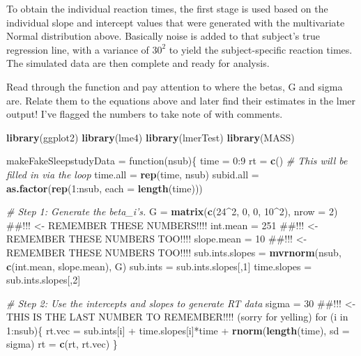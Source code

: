 \documentclass[]{book}
\newenvironment{Shaded}{\begin{snugshade}}{\end{snugshade}}
\newcommand{\KeywordTok}[1]{\textcolor[rgb]{0.13,0.29,0.53}{\textbf{{#1}}}}
\newcommand{\DataTypeTok}[1]{\textcolor[rgb]{0.13,0.29,0.53}{{#1}}}
\newcommand{\DecValTok}[1]{\textcolor[rgb]{0.00,0.00,0.81}{{#1}}}
\newcommand{\StringTok}[1]{\textcolor[rgb]{0.31,0.60,0.02}{{#1}}}
\newcommand{\CommentTok}[1]{\textcolor[rgb]{0.56,0.35,0.01}{\textit{{#1}}}}
\newcommand{\NormalTok}[1]{{#1}}
\begin{document}
To obtain the individual reaction times, the first stage is used based
on the individual slope and intercept values that were generated with
the multivariate Normal distribution above. Basically noise is added to
that subject's true regression line, with a variance of \(30^2\) to
yield the subject-specific reaction times. The simulated data are then
complete and ready for analysis.

Read through the function and pay attention to where the betas, G and
sigma are. Relate them to the equations above and later find their
estimates in the lmer output! I've flagged the numbers to take note of
with comments.

\begin{Shaded}
\begin{Highlighting}[]
\KeywordTok{library}\NormalTok{(ggplot2)}
\KeywordTok{library}\NormalTok{(lme4)}
\KeywordTok{library}\NormalTok{(lmerTest)}
\KeywordTok{library}\NormalTok{(MASS)}

\NormalTok{makeFakeSleepstudyData =}\StringTok{ }\NormalTok{function(nsub)\{}
  \NormalTok{time =}\StringTok{ }\DecValTok{0}\NormalTok{:}\DecValTok{9}
  \NormalTok{rt =}\StringTok{ }\KeywordTok{c}\NormalTok{() }\CommentTok{# This will be filled in via the loop}
  \NormalTok{time.all =}\StringTok{ }\KeywordTok{rep}\NormalTok{(time, nsub)}
  \NormalTok{subid.all =}\StringTok{ }\KeywordTok{as.factor}\NormalTok{(}\KeywordTok{rep}\NormalTok{(}\DecValTok{1}\NormalTok{:nsub, }\DataTypeTok{each =} \KeywordTok{length}\NormalTok{(time)))}
  
  \CommentTok{# Step 1:  Generate the beta_i's.  }
  \NormalTok{G =}\StringTok{ }\KeywordTok{matrix}\NormalTok{(}\KeywordTok{c}\NormalTok{(}\DecValTok{24}\NormalTok{^}\DecValTok{2}\NormalTok{, }\DecValTok{0}\NormalTok{, }\DecValTok{0}\NormalTok{, }\DecValTok{10}\NormalTok{^}\DecValTok{2}\NormalTok{), }\DataTypeTok{nrow =} \DecValTok{2}\NormalTok{)   ##!!! <- REMEMBER THESE NUMBERS!!!!}
  \NormalTok{int.mean =}\StringTok{ }\DecValTok{251}  \NormalTok{##!!! <- REMEMBER THESE NUMBERS TOO!!!!}
  \NormalTok{slope.mean =}\StringTok{ }\DecValTok{10}  \NormalTok{##!!! <- REMEMBER THESE NUMBERS TOO!!!!}
  \NormalTok{sub.ints.slopes =}\StringTok{ }\KeywordTok{mvrnorm}\NormalTok{(nsub, }\KeywordTok{c}\NormalTok{(int.mean, slope.mean), G)}
  \NormalTok{sub.ints =}\StringTok{ }\NormalTok{sub.ints.slopes[,}\DecValTok{1}\NormalTok{]}
  \NormalTok{time.slopes =}\StringTok{ }\NormalTok{sub.ints.slopes[,}\DecValTok{2}\NormalTok{]}
  
  \CommentTok{# Step 2:  Use the intercepts and slopes to generate RT data}
  \NormalTok{sigma =}\StringTok{ }\DecValTok{30}      \NormalTok{##!!! <- THIS IS THE LAST NUMBER TO REMEMBER!!!! (sorry for yelling)}
  \NormalTok{for (i in }\DecValTok{1}\NormalTok{:nsub)\{}
    \NormalTok{rt.vec =}\StringTok{ }\NormalTok{sub.ints[i] +}\StringTok{ }\NormalTok{time.slopes[i]*time +}\StringTok{ }\KeywordTok{rnorm}\NormalTok{(}\KeywordTok{length}\NormalTok{(time), }\DataTypeTok{sd =} \NormalTok{sigma)}
    \NormalTok{rt =}\StringTok{ }\KeywordTok{c}\NormalTok{(rt, rt.vec)}
  \NormalTok{\}}
  

\end{Highlighting}
\end{Shaded}
\end{document}
